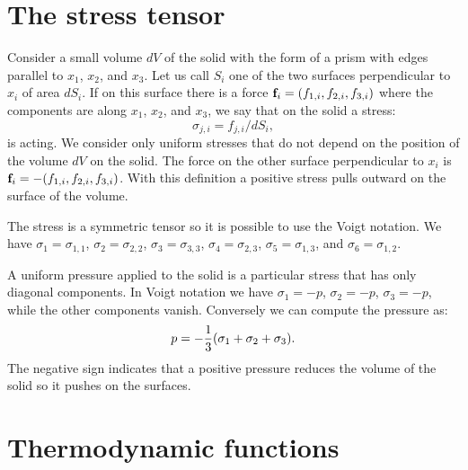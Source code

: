 \documentclass[12pt,a4paper]{article}
\begin{document}
\newpage
\section{\color{coral}The stress tensor}

Consider a small volume $dV$ of the solid with the form of a prism with 
edges parallel to $x_1$, $x_2$, and $x_3$. Let us call $S_i$ one of
the two surfaces perpendicular to $x_i$ of area $dS_i$. If on this surface 
there is a force ${\bf f}_i=(f_{1,i}, f_{2,i}, f_{3,i})$ where the components
are along $x_1$, $x_2$, and $x_3$, we say that on the solid a
stress: 
\begin{equation}
\sigma_{j,i}=f_{j,i} / dS_i, 
\end{equation}
is acting.
We consider only uniform stresses
that do not depend on the position of the volume $dV$ on the solid.
The force on the other surface perpendicular to $x_i$ is 
${\bf f}_i=-(f_{1,i}, f_{2,i}, f_{3,i})$. With this definition a positive
stress pulls outward on the surface of the volume.

The stress is a symmetric tensor so it is possible to use the Voigt
notation. We have
$\sigma_1=\sigma_{1,1}$,
$\sigma_2=\sigma_{2,2}$, $\sigma_3=\sigma_{3,3}$, $\sigma_4=\sigma_{2,3}$,
$\sigma_5=\sigma_{1,3}$, and $\sigma_6=\sigma_{1,2}$.

A uniform pressure applied to the solid is a particular stress that has
only diagonal components. In Voigt notation we have
$\sigma_1=-p$, $\sigma_2=-p$, $\sigma_3=-p$, while the other components
vanish. Conversely we can compute the pressure as:
\begin{equation}
p=-{1\over 3} (\sigma_1 + \sigma_2 + \sigma_3).
\end{equation}
The negative sign indicates that a positive pressure reduces the
volume of the solid so it pushes on the surfaces.

\newpage
\section{\color{coral}Thermodynamic functions}
\end{document}
